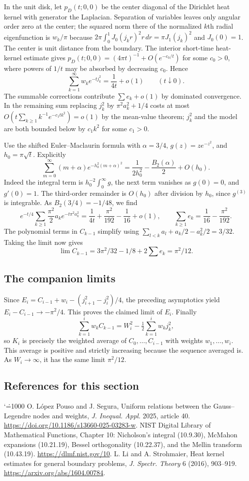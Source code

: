 \documentclass[11pt,a4paper]{article}
\makeatletter
\numberwithin{equation}{section}
\theoremstyle{definition}
\theoremstyle{remark}
\renewenvironment{thebibliography}[1]
 {\subsection*{References for this section}\small
  \list{\@biblabel{\@arabic\c@enumiv}}
       {\settowidth\labelwidth{\@biblabel{#1}}\leftmargin\labelwidth
        \advance\leftmargin\labelsep\@openbib@code
        \usecounter{enumiv}\let\p@enumiv\@empty
        \renewcommand\theenumiv{\@arabic\c@enumiv}}
  \sloppy\clubpenalty4000\widowpenalty4000\sfcode`\.=1000\relax}
 {\def\@noitemerr{\@latex@warning{Empty bibliography}}\endlist}
\makeatother
\begin{document}
In the unit disk, let $p_D(t;0,0)$ be the center diagonal of the Dirichlet heat kernel with generator the Laplacian. Separation of variables leaves only angular order zero at the center; the squared norm there of the normalized $k$th radial eigenfunction is $w_k/\pi$ because $2\pi\int_0^1 J_0(j_kr)^2r\,dr=\pi J_1(j_k)^2$ and $J_0(0)=1$. The center is unit distance from the boundary. The interior short-time heat-kernel estimate \cite{r36showa:heat} gives $p_D(t;0,0)=(4\pi t)^{-1}+O(e^{-c_0/t})$ for some $c_0>0$, where powers of $1/t$ may be absorbed by decreasing $c_0$. Hence
\[
 \sum_{k=1}^{\infty} w_k e^{-t j_k^2}=\frac1{4t}+o(1)\qquad(t\downarrow0).
\]
The summable corrections contribute $\sum e_k+o(1)$ by dominated convergence. In the remaining sum replacing $j_k^2$ by $\pi^2a_k^2+1/4$ costs at most $O(t\sum_{k\ge1}k^{-1}e^{-c_1t k^2})=o(1)$ by the mean-value theorem; $j_k^2$ and the model are both bounded below by $c_1 k^2$ for some $c_1>0$.

Use the shifted Euler--Maclaurin formula with $\alpha=3/4$, $g(z)=ze^{-z^2}$, and $h_0=\pi\sqrt t$. Explicitly
\[
 \sum_{m=0}^\infty (m+\alpha)e^{-h_0^2(m+\alpha)^2}
 =\frac1{2h_0^2}-\frac{B_2(\alpha)}{2}+O(h_0).
\]
Indeed the integral term is $h_0^{-2}\int_0^\infty g$, the next term vanishes as $g(0)=0$, and $g'(0)=1$. The third-order remainder is $O(h_0)$ after division by $h_0$, since $g^{(3)}$ is integrable. As $B_2(3/4)=-1/48$, we find
\[
 e^{-t/4}\sum_{k\ge1}\frac{\pi^2}2a_k e^{-t\pi^2a_k^2}
 =\frac1{4t}+\frac{\pi^2}{192}-\frac1{16}+o(1),\qquad
 \sum_{k\ge1} e_k=\frac1{16}-\frac{\pi^2}{192}.
\]
The polynomial terms in $C_{k-1}$ simplify using
$\sum_{l<k} a_l+a_k/2-a_k^2/2=3/32$. Taking the limit now gives
\[
 \lim C_{k-1}=3\pi^2/32-1/8+2\sum e_k=\pi^2/12.
\]

\subsection{The companion limits}
Since $E_i=C_{i-1}+w_i-(j_{i+1}^2-j_i^2)/4$, the preceding asymptotics yield $E_i-C_{i-1}\to-\pi^2/4$. This proves the claimed limit of $E_i$. Finally
\[
 \sum_{k=1}^i w_k C_{k-1}=W_i^2-\tfrac12\sum_{k=1}^i w_k j_k^2 ,
\]
so $K_i$ is precisely the weighted average of $C_0,\ldots,C_{i-1}$ with weights $w_1,\ldots,w_i$. This average is positive and strictly increasing because the sequence averaged is. As $W_i\to\infty$, it has the same limit $\pi^2/12$.

\begin{thebibliography}{9}
 O. L\'opez Pouso and J. Segura, Uniform relations between the Gauss--Legendre nodes and weights, \emph{J. Inequal. Appl.} 2025, article 40. \url{https://doi.org/10.1186/s13660-025-03283-w}.
 NIST Digital Library of Mathematical Functions, Chapter 10: Nicholson's integral (10.9.30), McMahon expansions (10.21.19), Bessel orthogonality (10.22.37), and the Mellin transform (10.43.19). \url{https://dlmf.nist.gov/10}.
 L. Li and A. Strohmaier, Heat kernel estimates for general boundary problems, \emph{J. Spectr. Theory} 6 (2016), 903--919. \url{https://arxiv.org/abs/1604.00784}.
\end{thebibliography}
\end{document}
